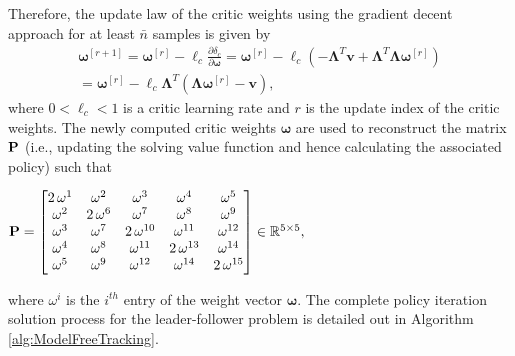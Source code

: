 \documentclass[letterpaper]{article} %
\begin{document}
Therefore, the update law of the critic weights using the gradient decent approach for at least $\bar n$ samples is given by %
\begin{multline}
  \bm{\omega}^{[r+1]} = \bm{\omega}^{[r]} - \ell_c\frac{\partial\delta_c}{\partial \bm{\omega}} = \bm{\omega}^{[r]} - \ell_c\left(-\bm{\Lambda}^T\mathbf{v} + \bm{\Lambda}^T \bm{\Lambda}\bm{\omega}^{[r]}\right)\\ 
=\bm{\omega}^{[r]} - \ell_c \bm{\Lambda}^T\left(\bm{\Lambda}\bm{\omega}^{[r]}-\mathbf{v}\right), 
\label{eq:criticWeights}
\end{multline}
%
where $0<\ell_c<1$ is a critic learning rate and $r$ is the  update index of the critic weights. %
%
The newly computed critic weights $\boldsymbol{\omega}$ are used to reconstruct the matrix ${\bf P}$ (i.e., updating the solving value function and hence calculating the associated policy) such that 
%
\begin{center}
${\bf P}=\begin{bmatrix} 
2\,\omega^{1}    & \omega^{2}      & \omega^{3}       & \omega^{4}       & \omega^{5} \\ 
\omega^{2}       &2\, \omega^{6}   & \omega^{7}       & \omega^{8}       & \omega^{9} \\
\omega^{3}       & \omega^{7}      &2\, \omega^{10}   & \omega^{11}      & \omega^{12} \\
\omega^{4}       & \omega^{8}      & \omega^{11}      & 2\,\omega^{13}   & \omega^{14} \\
\omega^{5}       & \omega^{9}      & \omega^{12}      & \omega^{14}      & 2\,\omega^{15}   
\end{bmatrix}\in \mathbb{R}^{5\times 5},$
\end{center}
%
where $\omega^{i}$ is the $i^{th}$ entry of the weight vector $\bm{\omega}.$ The complete policy iteration solution process for the leader-follower problem is detailed out in Algorithm \ref{alg:ModelFreeTracking}. %
%
\end{document}
